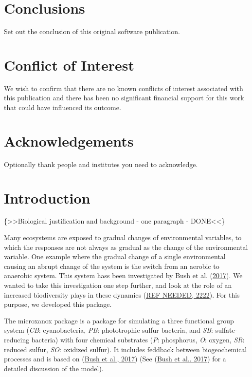 \documentclass[]{elsarticle} %
\begin{document}
\hypertarget{conclusions}{%
\section{Conclusions}\label{conclusions}}

Set out the conclusion of this original software publication.

\hypertarget{conflict-of-interest}{%
\section{Conflict of Interest}\label{conflict-of-interest}}

We wish to confirm that there are no known conflicts of interest
associated with this publication and there has been no significant
financial support for this work that could have influenced its outcome.

\hypertarget{acknowledgements}{%
\section{Acknowledgements}\label{acknowledgements}}

Optionally thank people and institutes you need to acknowledge.

\hypertarget{introduction}{%
\section{Introduction}\label{introduction}}

{\{\textgreater\textgreater Biological justification and background -
one paragraph - DONE\textless\textless\} }

Many ecosystems are exposed to gradual changes of environmental
variables, to which the responses are not always as gradual as the
change of the environmental variable. One example where the gradual
change of a single environmental causing an abrupt change of the system
is the switch from an aerobic to anaerobic system. This system hass been
investigated by Bush et al. (\protect\hyperlink{ref-Bush2017}{2017}). We
wanted to take this investigation one step further, and look at the role
of an increased biodiversity plays in these dynamics
(\protect\hyperlink{ref-REF_NEEDED}{REF NEEDED, 2222}). For this
purpose, we developed this package.

The microxanox package is a package for simulating a three functional
group system (\emph{CB}: cyanobacteria, \emph{PB}: phototrophic sulfur
bacteria, and \emph{SB}: sulfate-reducing bacteria) with four chemical
substrates (\emph{P}: phosphorus, \emph{O}: oxygen, \emph{SR}: reduced
sulfur, \emph{SO}: oxidized sulfur). It includes feddback between
biogeochemical processes and is based on
(\protect\hyperlink{ref-Bush2017}{Bush et al., 2017}) (See
(\protect\hyperlink{ref-Bush2017}{Bush et al., 2017}) for a detailed
discussion of the model).
\end{document}

